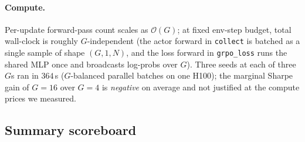 \paragraph{Compute.} Per-update forward-pass count scales as
$\mathcal{O}(G)$; at fixed env-step budget, total wall-clock is
roughly $G$-independent (the actor forward in \texttt{collect} is
batched as a single sample of shape $(G, 1, N)$, and the loss forward
in \texttt{grpo\_loss} runs the shared MLP once and broadcasts log-probs
over $G$). Three seeds at
each of three $G$s ran in $364$\,s ($G$-balanced parallel batches on
one H100); the marginal Sharpe gain of $G{=}16$ over $G{=}4$ is
\emph{negative} on average and not justified at the compute prices
we measured.

\subsection*{Summary scoreboard}

